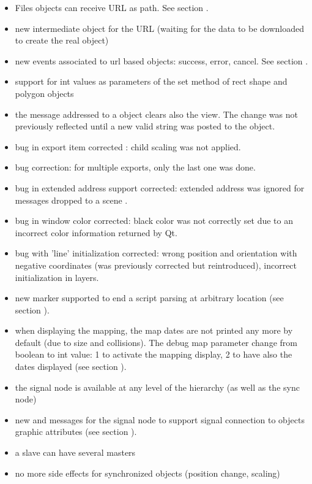\begin{itemize}
\item  Files objects can receive URL as path. See section .
\item new intermediate object for the URL (waiting for the data to be downloaded to create the real object)
\item new events associated to url based objects: success, error, cancel. See section .
\item  support for int values as parameters of the set method of rect shape and polygon objects
\item  the  message addressed to a  object clears also the view. The change was not previously reflected until a new valid string was posted to the object.


\item bug in export item corrected : child scaling was not applied.
\item bug correction: for multiple exports, only the last one was done.
\item bug in extended address support corrected: extended address was ignored for messages dropped to a scene .
\item bug in window color corrected: black color was not correctly set due to an incorrect color 
  information returned by Qt.
\item bug with 'line' initialization corrected: wrong position and orientation with negative coordinates (was previously corrected but reintroduced), incorrect initialization in layers.

\end{itemize}

\begin{itemize}
\item  new  marker supported to end a script parsing at arbitrary location  (see section ).
\item  when displaying the mapping, the map dates are not printed any more by default (due to size and collisions).  The debug map parameter change from boolean to int value: 1 to activate the mapping display, 
2 to have also the dates displayed  (see section ).
\item the signal node is available at any level of the hierarchy (as well as the sync node)
\item new  and  messages for the signal node to support signal connection to objects graphic attributes (see section ).
\item a slave can have several masters
\item no more side effects for synchronized objects (position change, scaling)
\end{itemize}

